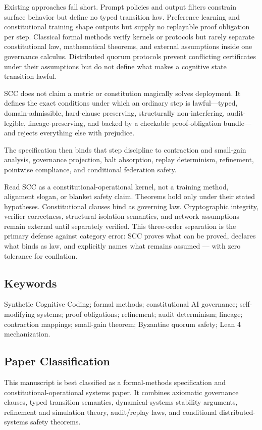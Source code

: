 \documentclass[10pt,oneside]{article}
\theoremstyle{definition}
\theoremstyle{remark}
\begin{document}
Existing approaches fall short. Prompt policies and output filters constrain surface behavior but define no typed transition law. Preference learning and constitutional training shape outputs but supply no replayable proof obligation per step. Classical formal methods verify kernels or protocols but rarely separate constitutional law, mathematical theorems, and external assumptions inside one governance calculus. Distributed quorum protocols prevent conflicting certificates under their assumptions but do not define what makes a cognitive state transition lawful.

SCC does not claim a metric or constitution magically solves deployment. It defines the exact conditions under which an ordinary step is lawful---typed, domain-admissible, hard-clause preserving, structurally non-interfering, audit-legible, lineage-preserving, and backed by a checkable proof-obligation bundle---and rejects everything else with prejudice.

The specification then binds that step discipline to contraction and small-gain analysis, governance projection, halt absorption, replay determinism, refinement, pointwise compliance, and conditional federation safety.

Read SCC as a constitutional-operational kernel, not a training method, alignment slogan, or blanket safety claim. Theorems hold only under their stated hypotheses. Constitutional clauses bind as governing law. Cryptographic integrity, verifier correctness, structural-isolation semantics, and network assumptions remain external until separately verified. This three-order separation is the primary defense against category error: SCC proves what can be proved, declares what binds as law, and explicitly names what remains assumed — with zero tolerance for conflation.

\subsection*{Keywords}
Synthetic Cognitive Coding; formal methods; constitutional AI governance; self-modifying systems; proof obligations; refinement; audit determinism; lineage; contraction mappings; small-gain theorem; Byzantine quorum safety; Lean 4 mechanization.

\subsection*{Paper Classification}
This manuscript is best classified as a formal-methods specification and constitutional-operational systems paper. It combines axiomatic governance clauses, typed transition semantics, dynamical-systems stability arguments, refinement and simulation theory, audit/replay laws, and conditional distributed-systems safety theorems.
\end{document}
